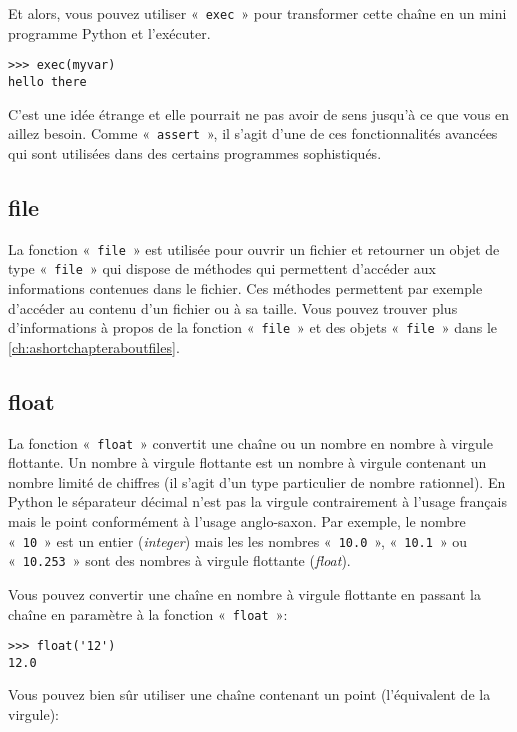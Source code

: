 Et alors, vous pouvez utiliser «~\texttt{exec}~» pour transformer cette chaîne en un mini programme Python et l'exécuter.
\begin{Verbatim}[frame=single,rulecolor=\color{gray}]
>>> exec(myvar)
hello there
\end{Verbatim}

C'est une idée étrange et elle pourrait ne pas avoir de sens jusqu'à ce que vous en aillez besoin. Comme «~\texttt{assert}~», il s'agit d'une de ces fonctionnalités   avancées qui sont utilisées dans des certains programmes sophistiqués.


\subsection*{file}

La fonction «~\texttt{file}~» est utilisée pour ouvrir un fichier et retourner un objet de type «~\texttt{file}~» qui dispose de méthodes qui permettent d'accéder aux informations contenues dans le fichier. Ces méthodes permettent par exemple d'accéder au contenu d'un fichier ou à sa taille. Vous pouvez trouver plus d'informations à propos de la fonction «~\texttt{file}~» et des objets «~\texttt{file}~» dans le \autoref{ch:ashortchapteraboutfiles}.

\subsection*{float}

La fonction «~\texttt{float}~» convertit une chaîne ou un nombre en nombre à virgule flottante. Un nombre à virgule flottante est un nombre à virgule contenant un nombre limité de chiffres (il s'agit d'un type particulier de nombre rationnel). En Python le séparateur décimal n'est pas la virgule contrairement à l'usage français mais le point conformément à l'usage anglo-saxon. Par exemple, le nombre «~\texttt{10}~» est un entier (\emph{integer}) mais les les nombres «~\texttt{10.0}~», «~\texttt{10.1}~» ou «~\texttt{10.253}~» sont des nombres à virgule flottante (\emph{float}).

Vous pouvez convertir une chaîne en nombre à virgule flottante en passant la chaîne en paramètre à la fonction «~\texttt{float}~»: 
\begin{Verbatim}[frame=single,rulecolor=\color{gray}]
>>> float('12')
12.0
\end{Verbatim}

Vous pouvez bien sûr utiliser une chaîne contenant un point (l'équivalent de la virgule):

